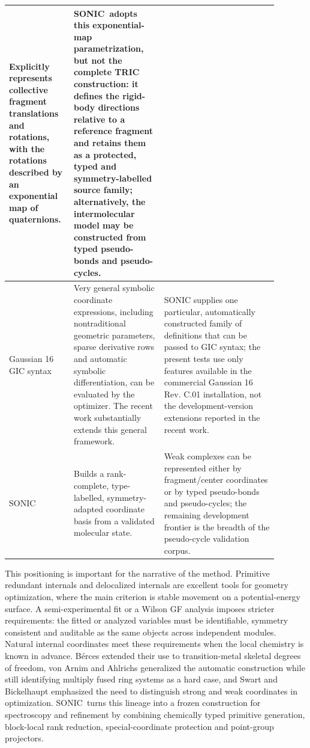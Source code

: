 \documentclass[journal=jctcce,manuscript=article,layout=traditional]{achemso}
\newcommand{\SONIC}{SONIC}
\theoremstyle{definition}
\begin{document}
\begin{table}[htbp]
\begin{tabular}{p{0.19\linewidth}p{0.31\linewidth}p{0.39\linewidth}}
Explicitly represents collective fragment
translations and rotations, with the rotations described by an exponential map
of quaternions.\cite{WangSong2016GeomeTRIC} & \SONIC\ adopts this
exponential-map parametrization, but not the complete TRIC construction: it
defines the rigid-body directions relative to a reference fragment and retains
them as a protected, typed and symmetry-labelled source family; alternatively,
the intermolecular model may be constructed from typed pseudo-bonds and
pseudo-cycles. \\
\midrule
Gaussian 16 GIC syntax & Very general symbolic coordinate expressions, including
nontraditional geometric parameters, sparse derivative rows and automatic
symbolic differentiation, can be evaluated by the optimizer.  The recent work
substantially extends this general framework.\cite{Marenich2025GIC} & \SONIC{}
supplies one particular, automatically constructed family of definitions that
can be passed to GIC syntax; the present tests use only features available in
the commercial Gaussian 16 Rev. C.01 installation, not the development-version
extensions reported in the recent work. \\
\midrule
\SONIC & Builds a rank-complete, type-labelled, symmetry-adapted coordinate basis
from a validated molecular state. & Weak complexes can be represented either
by fragment/center coordinates or by typed pseudo-bonds and
pseudo-cycles; the remaining development frontier is the breadth of the
pseudo-cycle validation corpus. \\
\bottomrule
\end{tabular}
\end{table}

This positioning is important for the narrative of the method.  Primitive
redundant internals and delocalized internals are excellent tools for geometry
optimization, where the main criterion is stable movement on a potential-energy
surface.  A semi-experimental fit or a Wilson GF analysis imposes stricter
requirements: the fitted or analyzed variables must be identifiable, symmetry
consistent and auditable as the same objects across independent modules.
Natural internal coordinates meet these requirements when the local chemistry is
known in advance.  B{\'e}rces extended their use to transition-metal skeletal
degrees of freedom,\cite{Berces1997NaturalMetal} von Arnim and Ahlrichs
generalized the automatic construction while still identifying multiply fused
ring systems as a hard case,\cite{VonArnimAhlrichs1999GNIC} and Swart and
Bickelhaupt emphasized the need to distinguish strong and weak coordinates in
optimization.\cite{SwartBickelhaupt2006StrongWeak}  \SONIC\ turns this lineage
into a frozen construction for spectroscopy and refinement by combining
chemically typed primitive generation, block-local rank reduction,
special-coordinate protection and point-group projectors.
\end{document}
